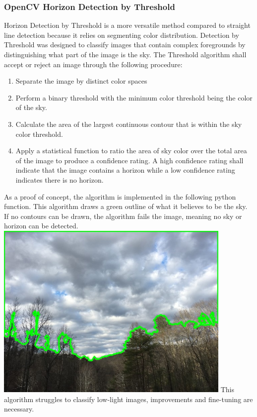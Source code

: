 \documentclass[onecolumn, draftclsnofoot,10pt, compsoc]{IEEEtran}
\begin{document}
\begin{singlespace}
				\subsubsection{OpenCV Horizon Detection by Threshold}
						Horizon Detection by Threshold is a more versatile method compared to straight line detection because it relies on segmenting color distribution.
					Detection by Threshold was designed to classify images that contain complex foregrounds by distinguishing what part of the image is the sky.
					The Threshold algorithm shall accept or reject an image through the following procedure:
					\begin{enumerate}
						\item Separate the image by distinct color spaces
						\item Perform a binary threshold with the minimum color threshold being the color of the sky.
						\item Calculate the area of the largest continuous contour that is within the sky color threshold.
						\item Apply a statistical function to ratio the area of sky color over the total area of the image to produce a confidence rating.
								A high confidence rating shall indicate that the image contains a horizon while a low confidence rating indicates there is no horizon.
					\end{enumerate}

					As a proof of concept, the algorithm is implemented in the following python function.
					This algorithm draws a green outline of what it believes to be the sky.
					If no contours can be drawn, the algorithm fails the image, meaning no sky or horizon can be detected.\\

					
							\includegraphics[width=4.5in,natwidth=640,natheight=480]{images/threshold/9.jpg}
					This algorithm struggles to classify low-light images, improvements and fine-tuning are necessary.


\end{singlespace}
\end{document}
